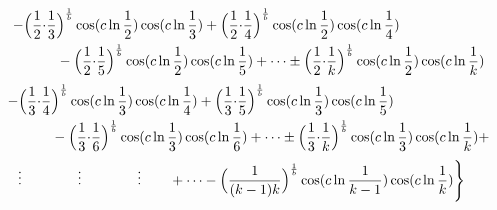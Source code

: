 \documentclass{amsart}
\begin{document}
	\[
	\begin{aligned}
		\quad - \Bigl( \frac{1}{2} {\cdot} \frac{1}{3}& \Bigr)^\frac1b \cos(c \ln \frac{1}{2}) \cos(c \ln \frac{1}{3}) + \Bigl( \frac{1}{2} {\cdot} \frac{1}{4} \Bigr)^\frac1b \cos(c \ln \frac{1}{2}) \cos(c \ln \frac{1}{4}) \\ 
		& - \Bigl( \frac{1}{2} {\cdot} \frac{1}{5} \Bigr)^\frac1b \cos(c \ln \frac{1}{2}) \cos(c \ln \frac{1}{5}) + \dots \pm \Bigl( \frac{1}{2} {\cdot} \frac{1}{k} \Bigr)^\frac1b \cos(c \ln \frac{1}{2}) \cos(c \ln \frac{1}{k}) \\
	\end{aligned}
	\]
	\[
	\begin{aligned}
		\quad - \Bigl( \frac{1}{3} {\cdot} \frac{1}{4}& \Bigr)^\frac1b \cos(c \ln \frac{1}{3}) \cos(c \ln \frac{1}{4}) + \Bigl( \frac{1}{3} {\cdot} \frac{1}{5} \Bigr)^\frac1b \cos(c \ln \frac{1}{3}) \cos(c \ln \frac{1}{5}) \\
		& - \Bigl( \frac{1}{3} {\cdot} \frac{1}{6} \Bigr)^\frac1b \cos(c \ln \frac{1}{3}) \cos(c \ln \frac{1}{6}) + \dots \pm \Bigl( \frac{1}{3} {\cdot} \frac{1}{k} \Bigr)^\frac1b \cos(c \ln \frac{1}{3}) \cos(c \ln \frac{1}{k}) + \\ 		
	\end{aligned}
	\]
	\[
	\begin{aligned}
		\vdots \qquad\qquad \vdots \qquad\qquad \vdots \qquad + \dots - \Bigl( \frac{1}{(k-1)k} \Bigr)^\frac1b \cos(c \ln \frac{1}{k-1}) \cos(c \ln \frac{1}{k}) \Biggr\}
	\end{aligned}
	\]
	
\end{document}
